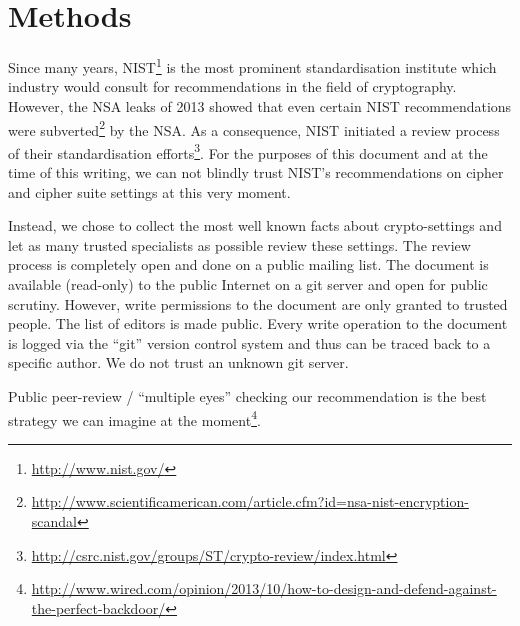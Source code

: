 \section{Methods}

Since many years, NIST\footnote{\url{http://www.nist.gov/}} is the most
prominent standardisation institute which industry would consult for
recommendations in the field of cryptography. However, the NSA leaks of 2013
showed that even certain NIST recommendations were
subverted\footnote{\url{http://www.scientificamerican.com/article.cfm?id=nsa-nist-encryption-scandal}}
by the NSA.  As a consequence, NIST initiated a review process of their
standardisation
efforts\footnote{\url{http://csrc.nist.gov/groups/ST/crypto-review/index.html}}.
For the purposes of this document and at the time of this writing, we
can not blindly trust NIST's recommendations on cipher and cipher suite
settings at this very moment. 

Instead, we chose to collect the most well known facts about crypto-settings
and let as many trusted specialists as possible review these settings.  The
review process is completely open and done on a public mailing list. The
document is available (read-only) to the public Internet on a git server and
open for public scrutiny. However, write permissions to the document are only
granted to trusted people. The list of editors is made public.  Every write
operation to the document is logged via the ``git'' version control system and
thus can be traced back to a specific author.  We do not trust an unknown git
server. 

Public peer-review / ``multiple eyes'' checking our recommendation is the best
strategy we can imagine at the moment\footnote{\url{http://www.wired.com/opinion/2013/10/how-to-design-and-defend-against-the-perfect-backdoor/}}.

